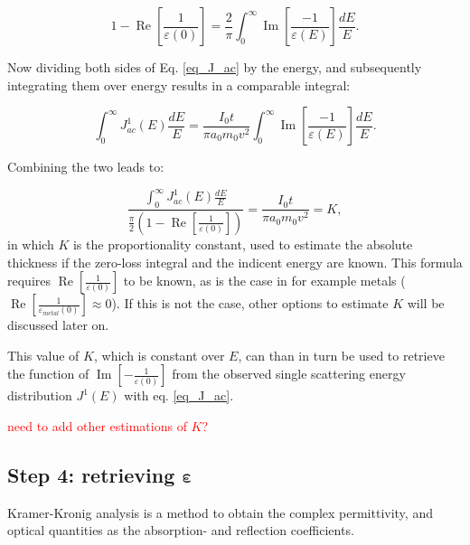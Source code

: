 \documentclass{article}
\begin{document}
\begin{equation}
    1-\operatorname{Re}\left[\frac{1}{\varepsilon(0)}\right]=\frac{2}{\pi} \int_{0}^{\infty} \operatorname{Im}\left[\frac{-1}{\varepsilon(E)}\right] \frac{d E}{E}.
\end{equation}

Now dividing both sides of Eq. \eqref{eq_J_ac} by the energy, and subsequently integrating them over energy results in a comparable integral:

\begin{equation}\label{eq_J_ac}
    \int_{0}^{\infty} J^1_{ac}(E) \frac{d E}{E}=  \frac{I_{0} t}{\pi a_{0} m_{0} v^{2}}  \int_{0}^{\infty} \operatorname{Im}\left[\frac{-1}{\varepsilon(E)}\right]   \frac{d E}{E} .
\end{equation}

Combining the two leads to:

\begin{equation}
    \frac{\int_{0}^{\infty} J^1_{ac}(E) \frac{d E}{E}}{\frac{\pi}{2}(1-\operatorname{Re}\left[\frac{1}{\varepsilon(0)}\right])} = \frac{I_{0} t}{\pi a_{0} m_{0} v^{2}} = K ,
\end{equation}
in which $K$ is the proportionality constant, used to estimate the absolute thickness if the zero-loss integral and the indicent energy are known. This formula requires $\operatorname{Re}\left[\frac{1}{\varepsilon(0)}\right]$ to be known, as is the case in for example metals ($\operatorname{Re}\left[\frac{1}{\varepsilon_{metal}(0)}\right]\approx 0$). If this is not the case, other options to estimate $K$ will be discussed later on.

This value of $K$, which is constant over $E$, can than in turn be used to retrieve the function of $\operatorname{Im}\left[-\frac{1}{\varepsilon(0)}\right]$ from the observed single scattering energy distribution $J^1(E)$ with eq. \eqref{eq_J_ac}.

\textcolor{red}{need to add other estimations of $K$?}

\subsection{Step 4: retrieving $\boldsymbol\varepsilon$}


\vspace{2cm}
Kramer-Kronig analysis is a method to obtain the complex permittivity, and optical quantities as the absorption- and reflection coefficients.



\end{document}
